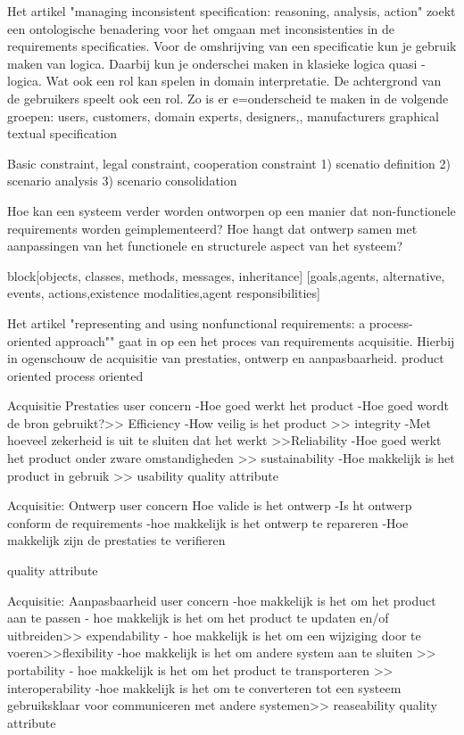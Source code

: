 Het artikel "managing inconsistent specification: reasoning, analysis, action" zoekt een ontologische benadering voor het omgaan met inconsistenties in de requirements specificaties.
Voor de omshrijving van een specificatie kun je gebruik maken van logica. Daarbij kun je onderschei maken in klasieke logica quasi -logica.
Wat ook een rol kan spelen in domain interpretatie. De achtergrond van de gebruikers speelt ook een rol.
Zo is er e=onderscheid te maken in de volgende groepen: users, customers, domain experts, designers,, manufacturers
graphical  textual specification

Basic constraint, legal constraint, cooperation constraint
1) scenatio  definition
2) scenario analysis
3) scenario consolidation


Hoe kan een systeem verder worden ontworpen op een manier dat non-functionele requirements worden geimplementeerd?
Hoe hangt dat ontwerp samen met aanpassingen van het functionele en structurele aspect van het systeem?

block[objects, classes, methods, messages, inheritance]
[goals,agents, alternative, events, actions,existence modalities,agent responsibilities]


Het artikel "representing and using nonfunctional requirements: a process-oriented approach"" gaat in op een het proces van requirements acquisitie. Hierbij in ogenschouw de acquisitie van prestaties, ontwerp en aanpasbaarheid.
product oriented
process oriented


Acquisitie Prestaties
user concern
-Hoe goed werkt het product
-Hoe goed wordt de bron gebruikt?>> Efficiency
-How veilig is het product >> integrity
-Met hoeveel zekerheid is uit  te sluiten dat het werkt >>Reliability
-Hoe goed werkt het product onder zware omstandigheden >> sustainability
-Hoe makkelijk is het product in gebruik >> usability
quality attribute


Acquisitie: Ontwerp
user concern
Hoe valide is het ontwerp
-Is ht ontwerp conform de requirements
-hoe makkelijk is het ontwerp te repareren
-Hoe makkelijk zijn de prestaties te verifieren

quality attribute


Acquisitie: Aanpasbaarheid
user concern
-hoe makkelijk is het om het product aan te passen
- hoe makkelijk is het om het product te updaten en/of uitbreiden>> expendability
- hoe makkelijk is het om een wijziging door te voeren>>flexibility
-hoe makkelijk is het om andere system aan te sluiten >> portability
- hoe makkelijk is het om het product te transporteren >> interoperability
-hoe makkelijk is het om te converteren tot een systeem gebruiksklaar voor communiceren met andere systemen>> reaseability
quality attribute




